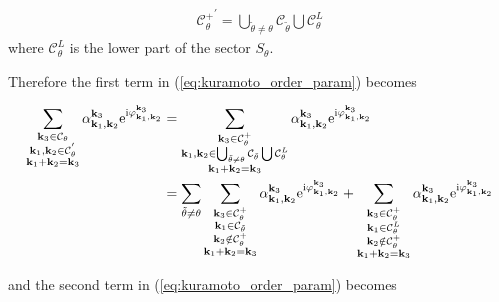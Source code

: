 \documentclass[9pt]{article}
\newcommand{\triad}[3]{\varphi_{#1, #2}^{#3}}                     %
\newcommand{\ii}{\mathrm{i}}      								  %
\newcommand{\e}{\mathrm{e}}      								  %
\newcommand{\alphakkk}[3]{\alpha_{\bfkn{#1}, \bfkn{#2}}^{\bfkn{#3}}}
\newcommand{\bfkn}[1]{\mathbf{k}_{#1}}								%
\begin{document}
\begin{align}
	{\mathcal{C}_{\theta}^{+}}^{'} = \bigcup_{\tilde{\theta} \neq \theta} \mathcal{C}_{\tilde{\theta}} \bigcup \mathcal{C}_{\theta}^{L}
\end{align}
where $\mathcal{C}_{\theta}^{L}$ is the lower part of the sector $S_{\theta}$.

Therefore the first term in (\ref{eq:kuramoto_order_param}) becomes

\begin{align}
	\sum_{\substack{\bfkn{3} \in \mathcal{C}_{\theta} \\ \bfkn{1},  \bfkn{2} \in \mathcal{C}_{\theta}^{'} \\ \bfkn{1} + \bfkn{2} = \bfkn{3}}} \alphakkk{{1}}{2}{3}\e^{\ii \triad{\bfkn{1}}{\bfkn{2}}{\bfkn{3}}} &= \sum_{\substack{\bfkn{3} \in \mathcal{C}_{\theta}^{+} \\ \bfkn{1},  \bfkn{2} \in \bigcup_{\tilde{\theta} \neq \theta} \mathcal{C}_{\tilde{\theta}} \bigcup \mathcal{C}_{\theta}^{L} \\ \bfkn{1} + \bfkn{2} = \bfkn{3}}} \alphakkk{{1}}{2}{3}\e^{\ii \triad{\bfkn{1}}{\bfkn{2}}{\bfkn{3}}} \notag \\
	&= \sum_{\tilde{\theta} \neq \theta} \sum_{\substack{\bfkn{3} \in \mathcal{C}_{\theta}^{+} \\ \bfkn{1} \in \mathcal{C}_{\tilde{\theta}} \\ \bfkn{2} \notin \mathcal{C}_{\theta}^{+} \\ \bfkn{1} + \bfkn{2} = \bfkn{3}}} \alphakkk{{1}}{2}{3}\e^{\ii \triad{\bfkn{1}}{\bfkn{2}}{\bfkn{3}}} + \sum_{\substack{\bfkn{3} \in \mathcal{C}_{\theta}^{+} \\ \bfkn{1} \in \mathcal{C}_{\theta}^{L} \\ \bfkn{2} \notin \mathcal{C}_{\theta}^{+} \\ \bfkn{1} + \bfkn{2} = \bfkn{3}}} \alphakkk{{1}}{2}{3}\e^{\ii \triad{\bfkn{1}}{\bfkn{2}}{\bfkn{3}}}
\end{align}

and the second term in (\ref{eq:kuramoto_order_param}) becomes
\end{document}
